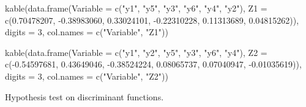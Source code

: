 \documentclass[
  letterpaper,
  DIV=11,
  numbers=noendperiod]{scrartcl}
\newenvironment{Shaded}{\begin{snugshade}}{\end{snugshade}}
\newcommand{\AttributeTok}[1]{\textcolor[rgb]{0.40,0.45,0.13}{#1}}
\newcommand{\DecValTok}[1]{\textcolor[rgb]{0.68,0.00,0.00}{#1}}
\newcommand{\FloatTok}[1]{\textcolor[rgb]{0.68,0.00,0.00}{#1}}
\newcommand{\FunctionTok}[1]{\textcolor[rgb]{0.28,0.35,0.67}{#1}}
\newcommand{\NormalTok}[1]{\textcolor[rgb]{0.00,0.23,0.31}{#1}}
\newcommand{\OtherTok}[1]{\textcolor[rgb]{0.00,0.23,0.31}{#1}}
\newcommand{\SpecialCharTok}[1]{\textcolor[rgb]{0.37,0.37,0.37}{#1}}
\newcommand{\StringTok}[1]{\textcolor[rgb]{0.13,0.47,0.30}{#1}}
\begin{document}
\begin{Shaded}
\begin{Highlighting}[]
\FunctionTok{kable}\NormalTok{(}\FunctionTok{data.frame}\NormalTok{(}\AttributeTok{Variable =} \FunctionTok{c}\NormalTok{(}\StringTok{"y1"}\NormalTok{, }\StringTok{"y5"}\NormalTok{, }\StringTok{"y3"}\NormalTok{, }\StringTok{"y6"}\NormalTok{, }\StringTok{"y4"}\NormalTok{, }\StringTok{"y2"}\NormalTok{),}
                 \AttributeTok{Z1 =} \FunctionTok{c}\NormalTok{(}\FloatTok{0.70478207}\NormalTok{,}
                        \SpecialCharTok{{-}}\FloatTok{0.38983060}\NormalTok{,}
                        \FloatTok{0.33024101}\NormalTok{,}
                        \SpecialCharTok{{-}}\FloatTok{0.22310228}\NormalTok{,}
                        \FloatTok{0.11313689}\NormalTok{,}
                        \FloatTok{0.04815262}\NormalTok{)),}
      \AttributeTok{digits =} \DecValTok{3}\NormalTok{,}
      \AttributeTok{col.names =} \FunctionTok{c}\NormalTok{(}\StringTok{"Variable"}\NormalTok{, }\StringTok{"Z1"}\NormalTok{))}

\FunctionTok{kable}\NormalTok{(}\FunctionTok{data.frame}\NormalTok{(}\AttributeTok{Variable =} \FunctionTok{c}\NormalTok{(}\StringTok{"y1"}\NormalTok{, }\StringTok{"y2"}\NormalTok{, }\StringTok{"y5"}\NormalTok{, }\StringTok{"y3"}\NormalTok{, }\StringTok{"y6"}\NormalTok{, }\StringTok{"y4"}\NormalTok{),}
                 \AttributeTok{Z2 =} \FunctionTok{c}\NormalTok{(}\SpecialCharTok{{-}}\FloatTok{0.54597681}\NormalTok{,}
                        \FloatTok{0.43649046}\NormalTok{,}
                        \SpecialCharTok{{-}}\FloatTok{0.38524224}\NormalTok{,}
                        \FloatTok{0.08065737}\NormalTok{,}
                        \FloatTok{0.07040947}\NormalTok{,}
                        \SpecialCharTok{{-}}\FloatTok{0.01035619}\NormalTok{)),}
      \AttributeTok{digits =} \DecValTok{3}\NormalTok{,}
      \AttributeTok{col.names =} \FunctionTok{c}\NormalTok{(}\StringTok{"Variable"}\NormalTok{, }\StringTok{"Z2"}\NormalTok{))}
\end{Highlighting}
\end{Shaded}

Hypothesis test on discriminant functions.

\begin{Shaded}
\end{Shaded}
\end{document}
